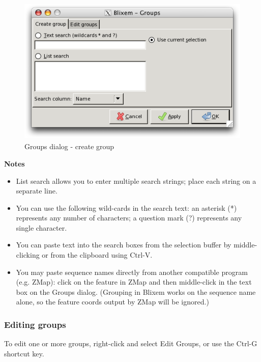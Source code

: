 \documentclass[letterpaper]{article}
\newcommand\liststyleWWviiiNumxvi{%
\renewcommand\labelitemi{{\textbullet}}
\renewcommand\labelitemii{o}
\renewcommand\labelitemiii{[F0A7?]}
\renewcommand\labelitemiv{[F0B7?]}
}
\begin{document}
\begin{figure}
\centering
\color[rgb]{0.30980393,0.5058824,0.7411765}
\includegraphics[width=11.95cm,height=7.084cm]{img_dialog_groups.png}
\caption{Groups dialog - create group}
\label{img_dialog_groups}
\end{figure}

\bigskip

{\bfseries
Notes}

\liststyleWWviiiNumxvi
\begin{itemize}
\item {{\textquotesingle}List search{\textquotesingle} allows you to enter multiple search strings; place each string on a separate line.}
\item {You can use the following wild-cards in the search text: an asterisk (*) represents any number of characters; a question mark (?) represents any single character.}
\item {You can paste text into the search boxes from the selection buffer by middle-clicking or from the clipboard using Ctrl-V.}
\item {You may paste sequence names directly from another compatible program (e.g. ZMap): click on the feature in ZMap and then middle-click in the text box on the Groups dialog. (Grouping in Blixem works on the sequence name alone, so the feature coords output by ZMap will be ignored.)}
\end{itemize}

{\color[rgb]{0.30980393,0.5058824,0.7411765}\subsubsection[Editing groups]{Editing groups}}
\hypertarget{RefHeading2141056909880}{}
\label{section:edit_group}
{To edit one or more groups, right-click and select {\textquotesingle}Edit Groups{\textquotesingle}, or use the Ctrl-G shortcut key.}
\end{document}
